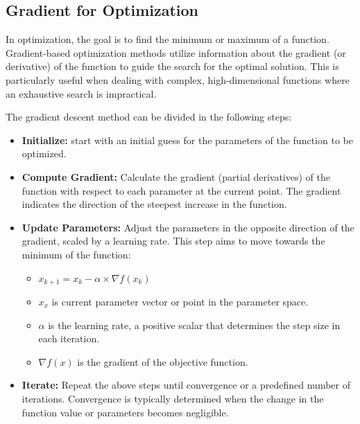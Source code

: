 \documentclass[
  letterpaper,
  DIV=11,
  numbers=noendperiod]{scrreprt}
\providecommand{\tightlist}{%
  \setlength{\itemsep}{0pt}\setlength{\parskip}{0pt}}\usepackage{longtable,booktabs,array}
\begin{document}
\subsection{Gradient for Optimization}\label{gradient-for-optimization}

In optimization, the goal is to find the minimum or maximum of a
function. Gradient-based optimization methods utilize information about
the gradient (or derivative) of the function to guide the search for the
optimal solution. This is particularly useful when dealing with complex,
high-dimensional functions where an exhaustive search is impractical.

The gradient descent method can be divided in the following steps:

\begin{itemize}
\tightlist
\item
  \textbf{Initialize:} start with an initial guess for the parameters of
  the function to be optimized.
\item
  \textbf{Compute Gradient:} Calculate the gradient (partial
  derivatives) of the function with respect to each parameter at the
  current point. The gradient indicates the direction of the steepest
  increase in the function.
\item
  \textbf{Update Parameters:} Adjust the parameters in the opposite
  direction of the gradient, scaled by a learning rate. This step aims
  to move towards the minimum of the function:

  \begin{itemize}
  \tightlist
  \item
    \(x_{k+1} = x_k - \alpha \times \nabla f(x_{k})\)
  \item
    \(x_{x}\) is current parameter vector or point in the parameter
    space.
  \item
    \(\alpha\) is the learning rate, a positive scalar that determines
    the step size in each iteration.
  \item
    \(\nabla f(x)\) is the gradient of the objective function.
  \end{itemize}
\item
  \textbf{Iterate:} Repeat the above steps until convergence or a
  predefined number of iterations. Convergence is typically determined
  when the change in the function value or parameters becomes
  negligible.
\end{itemize}
\end{document}
